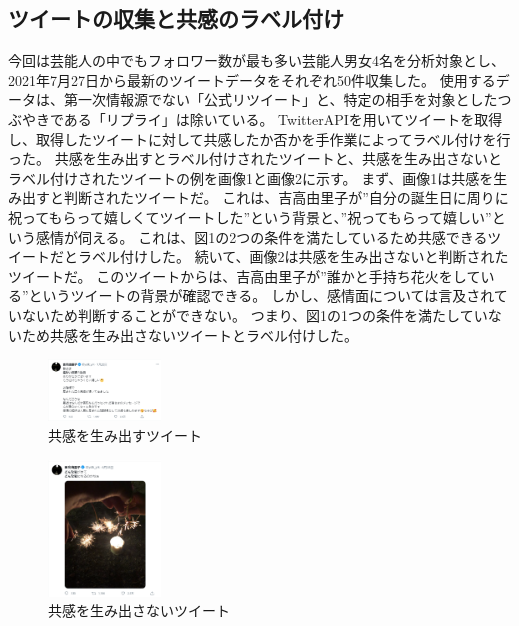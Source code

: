 \documentclass[dvipdfmx]{issj}
\begin{document}
\subsection{ツイートの収集と共感のラベル付け }  %
今回は芸能人の中でもフォロワー数が最も多い芸能人男女4名を分析対象とし、2021年7月27日から最新のツイートデータをそれぞれ50件収集した。
使用するデータは、第一次情報源でない「公式リツイート」と、特定の相手を対象としたつぶやきである「リプライ」は除いている。
TwitterAPIを用いてツイートを取得し、取得したツイートに対して共感したか否かを手作業によってラベル付けを行った。
共感を生み出すとラベル付けされたツイートと、共感を生み出さないとラベル付けされたツイートの例を画像1と画像2に示す。
まず、画像1は共感を生み出すと判断されたツイートだ。
これは、吉高由里子が”自分の誕生日に周りに祝ってもらって嬉しくてツイートした”という背景と、”祝ってもらって嬉しい”という感情が伺える。
これは、図1の2つの条件を満たしているため共感できるツイートだとラベル付けした。
続いて、画像2は共感を生み出さないと判断されたツイートだ。
このツイートからは、吉高由里子が”誰かと手持ち花火をしている”というツイートの背景が確認できる。
しかし、感情面については言及されていないため判断することができない。
つまり、図1の1つの条件を満たしていないため共感を生み出さないツイートとラベル付けした。

\begin{figure}[htbp]\centering
\includegraphics[width=30mm]{fig1.png}
\caption{共感を生み出すツイート}\label{fig:example} 
\end{figure}

\begin{figure}[htbp]\centering
\includegraphics	[width=30mm]{fig2.png}
\caption{共感を生み出さないツイート}\label{fig:example} 
\end{figure}



\end{document}
